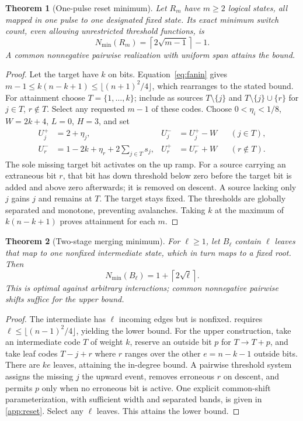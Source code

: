 \documentclass[12pt,letterpaper]{article}
\newtheorem{theorem}{Theorem}[section]
\theoremstyle{definition}\newtheorem{definition}[theorem]{Definition}
\theoremstyle{remark}\newtheorem{remark}[theorem]{Remark}
\newcommand{\Nmin}{N_{\min}}
\newcommand{\ceil}[1]{\left\lceil #1\right\rceil}
\begin{document}
\begin{theorem}[One-pulse reset minimum]\label{thm:reset}
Let $R_m$ have $m\ge2$ logical states, all mapped in one pulse to one designated fixed state. Its exact minimum switch count, even allowing unrestricted threshold functions, is
\begin{equation}\label{eq:reset}
\boxed{\Nmin(R_m)=\ceil{2\sqrt{m-1}}-1.}
\end{equation}
A common nonnegative pairwise realization with uniform span attains the bound.
\end{theorem}
\begin{proof}
Let the target have $k$ on bits. Equation~\eqref{eq:fanin} gives $m-1\le k(n-k+1)\le\lfloor(n+1)^2/4\rfloor$, which rearranges to the stated bound. For attainment choose $T=\{1,\ldots,k\}$; include as sources $T\setminus\{j\}$ and $T\setminus\{j\}\cup\{r\}$ for $j\in T$, $r\notin T$. Select any requested $m-1$ of these codes. Choose $0<\eta_i<1/8$, $W=2k+4$, $L=0$, $H=3$, and set
\begin{align}\label{eq:resetdesign}
 U_j^+&=2+\eta_j,& U_j^-&=U_j^+-W &&(j\in T),\\
 U_r^-&=1-2k+\eta_r+2\sum_{j\in T}s_j,& U_r^+&=U_r^-+W &&(r\notin T).\nonumber
\end{align}
The sole missing target bit activates on the up ramp. For a source carrying an extraneous bit $r$, that bit has down threshold below zero before the target bit is added and above zero afterwards; it is removed on descent. A source lacking only $j$ gains $j$ and remains at $T$. The target stays fixed. The thresholds are globally separated and monotone, preventing avalanches. Taking $k$ at the maximum of $k(n-k+1)$ proves attainment for each $m$.
\end{proof}

\begin{theorem}[Two-stage merging minimum]\label{thm:broom}
For $\ell\ge1$, let $B_\ell$ contain $\ell$ leaves that map to one nonfixed intermediate state, which in turn maps to a fixed root. Then
\begin{equation}\label{eq:broom}
\boxed{\Nmin(B_\ell)=1+\ceil{2\sqrt\ell}.}
\end{equation}
This is optimal against arbitrary interactions; common nonnegative pairwise shifts suffice for the upper bound.
\end{theorem}
\begin{proof}
The intermediate has $\ell$ incoming edges but is nonfixed.  requires $\ell\le\lfloor(n-1)^2/4\rfloor$, yielding the lower bound. For the upper construction, take an intermediate code $T$ of weight $k$, reserve an outside bit $p$ for $T\to T+p$, and take leaf codes $T-j+r$ where $r$ ranges over the other $e=n-k-1$ outside bits. There are $ke$ leaves, attaining the in-degree bound. A pairwise threshold system assigns the missing $j$ the upward event, removes erroneous $r$ on descent, and permits $p$ only when no erroneous bit is active. One explicit common-shift parameterization, with sufficient width and separated bands, is given in \cref{app:reset}. Select any $\ell$ leaves. This attains the lower bound.
\end{proof}
\end{document}
